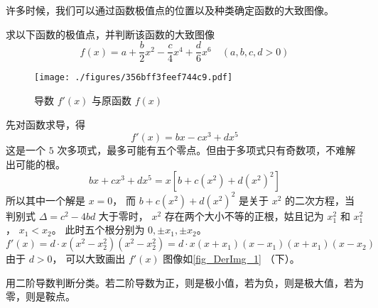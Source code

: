 
许多时候，我们可以通过函数极值点的位置以及种类确定函数的大致图像。

\begin{example}{}
求以下函数的极值点，并判断该函数的大致图像
\begin{equation}
f(x) = a + \frac{b}{2} x^2 - \frac{c}{4} x^4 + \frac{d}{6} x^6 \quad (a,b,c,d >0)
\end{equation}

\begin{figure}[ht]
\centering
\texttt{[image: ./figures/356bff3feef744c9.pdf]}
\caption{导数 $f'(x)$ 与原函数 $f(x)$}\label{fig_DerImg_1}
\end{figure}

先对函数求导，得
\begin{equation}
f'(x) = bx - c x^3 + d x^5
\end{equation}
这是一个 $5$ 次多项式，最多可能有五个零点。但由于多项式只有奇数项，不难解出可能的根。
 \begin{equation}
bx + c x^3 + d x^5 = x[b + c(x^2) + d(x^2)^2 ]
\end{equation}
所以其中一个解是 $x = 0$， 而 $b + c(x^2) + d (x^2)^2$ 是关于 $x^2$ 的二次方程，当判别式 $\Delta  = c^2 - 4bd$ 大于零时， $x^2$ 存在两个大小不等的正根，姑且记为 $x_1^2$ 和 $x_1^2$， $x_1 < x_2$。 
此时五个根分别为 $0, \pm x_1, \pm x_2$。 
\begin{equation}
f'(x) = d \cdot x (x^2 - x_2^2) (x^2 - x_2^2) = d \cdot x (x + x_1)(x - x_1)(x + x_1)(x - x_2)
\end{equation} 
由于 $d > 0$， 可以大致画出 $f'(x)$ 图像如\autoref{fig_DerImg_1} （下）。

用二阶导数判断分类。若二阶导数为正，则是极小值，若为负，则是极大值，若为零，则是鞍点。
\end{example}
